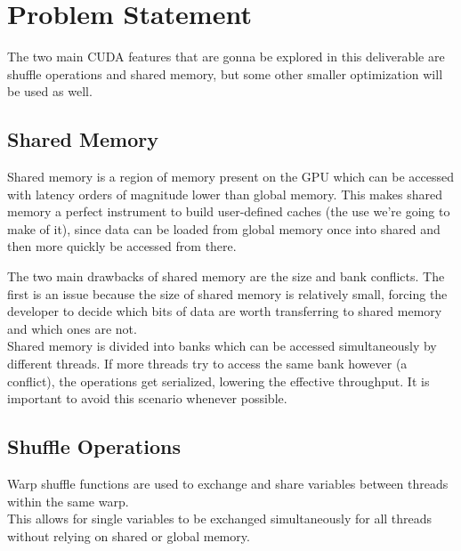 \documentclass[conference]{IEEEtran}
\begin{document}
\section{Problem Statement}
% 
The two main CUDA features that are gonna be explored in this deliverable are shuffle operations and shared memory, but some other smaller optimization will be used as well.

\subsection{Shared Memory}
Shared memory is a region of memory present on the GPU which can be accessed with latency orders of magnitude lower than global memory. This makes shared memory a perfect instrument to build user-defined caches (the use we're going to make of it), since data can be loaded from global memory once into shared and then more quickly be accessed from there.

The two main drawbacks of shared memory are the size and bank conflicts. The first is an issue because the size of shared memory is relatively small, forcing the developer to decide which bits of data are worth transferring to shared memory and which ones are not.\\
Shared memory is divided into banks which can be accessed simultaneously by different threads. If more threads try to access the same bank however (a conflict), the operations get serialized, lowering the effective throughput. It is important to avoid this scenario whenever possible. \cite{sharedMem}

\subsection{Shuffle Operations}
Warp shuffle functions are used to exchange and share variables between threads within the same warp.\\
This allows for single variables to be exchanged simultaneously for all threads without relying on shared or global memory. \cite{shuffleOps}
\end{document}
